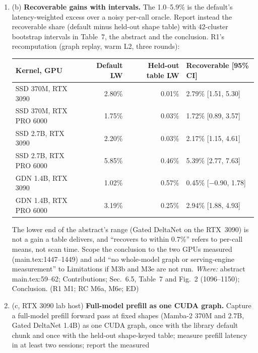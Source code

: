 \documentclass[11pt]{article}
\begin{document}
\begin{enumerate}[label=M3\alph*.]
  \item (b) \textbf{Recoverable gains with intervals.} The 1.0--5.9\% is the
        default's latency-weighted excess over a noisy per-call oracle. Report
        instead the recoverable share (default minus held-out shape table)
        with 42-cluster bootstrap intervals in Table~7, the abstract and the
        conclusion. R1's recomputation (graph replay, warm L2, three rounds):
        \begin{center}\small
        \begin{tabular}{lrrl}
        \toprule
        Kernel, GPU & Default LW & Held-out table LW & Recoverable [95\% CI] \\
        \midrule
        SSD 370M, RTX 3090 & 2.80\% & 0.01\% & 2.79\% [1.51, 5.30] \\
        SSD 370M, RTX PRO 6000 & 1.75\% & 0.03\% & 1.72\% [0.89, 3.57] \\
        SSD 2.7B, RTX 3090 & 2.20\% & 0.03\% & 2.17\% [1.15, 4.61] \\
        SSD 2.7B, RTX PRO 6000 & 5.85\% & 0.46\% & 5.39\% [2.77, 7.63] \\
        GDN 1.4B, RTX 3090 & 1.02\% & 0.57\% & 0.45\% [$-0.90$, 1.78] \\
        GDN 1.4B, RTX PRO 6000 & 3.19\% & 0.25\% & 2.94\% [1.88, 4.93] \\
        \bottomrule
        \end{tabular}
        \end{center}
        The lower end of the abstract's range (Gated DeltaNet on the RTX~3090)
        is not a gain a table delivers, and ``recovers to within 0.7\%''
        refers to per-call means, not scan time. Scope the conclusion to the
        two GPUs measured (main.tex:1447--1449) and add ``no whole-model graph
        or serving-engine measurement'' to Limitations if M3b and M3e are not
        run. \emph{Where:} abstract main.tex:59--62; Contributions; Sec.~6.5,
        Table~7 and Fig.~2 (1096--1150); Conclusion. (R1 M1; RC M6a, M6e; ED)
  \item (c, RTX 3090 lab host) \textbf{Full-model prefill as one CUDA graph.}
        Capture a full-model prefill forward pass at fixed shapes (Mamba-2
        370M and 2.7B, Gated DeltaNet 1.4B) as one CUDA graph, once with the
        library default chunk and once with the held-out shape-keyed table;
        measure prefill latency in at least two sessions; report the measured

\end{enumerate}
\end{document}
